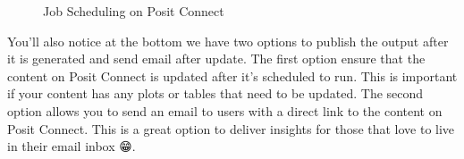 \documentclass[
  letterpaper,
  DIV=11,
  numbers=noendperiod]{scrreprt}
\begin{document}
\begin{figure}


\caption{\label{fig-schedule}Job Scheduling on Posit Connect}

\end{figure}%

You'll also notice at the bottom we have two options to publish the
output after it is generated and send email after update. The first
option ensure that the content on Posit Connect is updated after it's
scheduled to run. This is important if your content has any plots or
tables that need to be updated. The second option allows you to send an
email to users with a direct link to the content on Posit Connect. This
is a great option to deliver insights for those that love to live in
their email inbox 😁.
\end{document}
